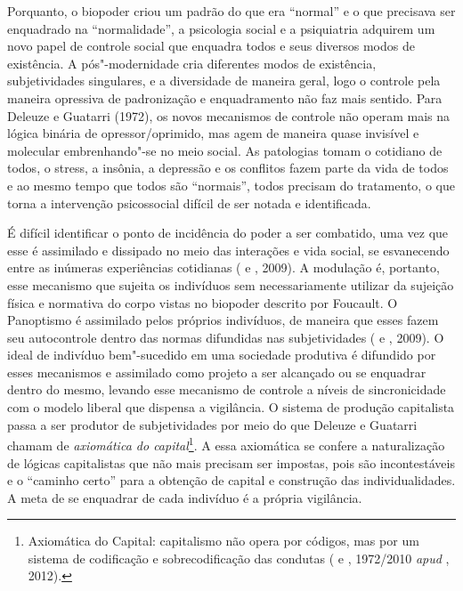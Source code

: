 Porquanto, o biopoder criou um padrão do que era ``normal'' e o que
precisava ser enquadrado na ``normalidade'', a psicologia social e a
psiquiatria adquirem um novo papel de controle social que enquadra todos
e seus diversos modos de existência. A pós"-modernidade cria diferentes
modos de existência, subjetividades singulares, e a diversidade de
maneira geral, logo o controle pela maneira opressiva de padronização e
enquadramento não faz mais sentido. Para Deleuze e Guatarri (1972), os
novos mecanismos de controle não operam mais na lógica binária de
opressor/oprimido, mas agem de maneira quase invisível e molecular
embrenhando"-se no meio social. As patologias tomam o cotidiano de todos,
o stress, a insônia, a depressão e os conflitos fazem parte da vida de
todos e ao mesmo tempo que todos são ``normais'', todos precisam do
tratamento, o que torna a intervenção psicossocial difícil de ser notada
e identificada.

É difícil identificar o ponto de incidência do poder a ser combatido,
uma vez que esse é assimilado e dissipado no meio das interações e vida
social, se esvanecendo entre as inúmeras experiências cotidianas ( e , 2009). A modulação é, portanto, esse mecanismo que
sujeita os indivíduos sem necessariamente utilizar da sujeição física e
normativa do corpo vistas no biopoder descrito por Foucault. O
Panoptismo é assimilado pelos próprios indivíduos, de maneira que esses
fazem seu autocontrole dentro das normas difundidas nas subjetividades
( e , 2009). O ideal de indivíduo bem"-sucedido em
uma sociedade produtiva é difundido por esses mecanismos e assimilado
como projeto a ser alcançado ou se enquadrar dentro do mesmo, levando
esse mecanismo de controle a níveis de sincronicidade com o modelo
liberal que dispensa a vigilância. O sistema de produção capitalista
passa a ser produtor de subjetividades por meio do que Deleuze e
Guatarri chamam de \emph{axiomática do capital}\footnote{Axiomática do
  Capital: capitalismo não opera por códigos, mas por um sistema de
  codificação e sobrecodificação das condutas ( e ,
  1972/2010 \emph{apud} , 2012).}. A essa axiomática se confere a
naturalização de lógicas capitalistas que não mais precisam ser
impostas, pois são incontestáveis e o ``caminho certo'' para a obtenção
de capital e construção das individualidades. A meta de se enquadrar de
cada indivíduo é a própria vigilância.

